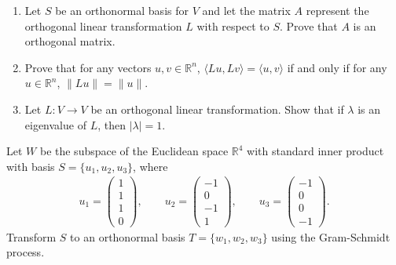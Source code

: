 \documentclass[12pt]{article}
\theoremstyle{remark}
\newtheorem*{solution}{Solution}
\newcommand{\R}{\mathbb{R}}
\renewcommand{\=}{&=&}
\newcommand{\<}{\langle}
\renewcommand{\>}{\rangle}
\newcommand{\bmat}{\begin{pmatrix}}
\newcommand{\emat}{\end{pmatrix}}
\newcommand{\beq}{\begin{eqnarray*}}
\newcommand{\eeq}{\end{eqnarray*}}
\begin{document}
\begin{problems}
\begin{enumerate}
	\item Let $S$ be an orthonormal basis for $V$ and let the matrix $A$ represent the 
	orthogonal linear transformation $L$ with respect to $S$. Prove that $A$ is an 
	orthogonal matrix.
	
	
	\item Prove that for any vectors $u, v \in \R^n$, $\<Lu,Lv\> = \<u,v\>$ if and only if for
	any $u \in \R^n$, $\|Lu\|=\|u\|$.
	
	
	\item Let $L:V \to V$ be an orthogonal linear transformation. Show that
	if $\lambda$ is an eigenvalue of $L$, then $|\lambda| = 1$.
	
\end{enumerate}



\item
Let $W$ be the subspace of the Euclidean space $\R^4$ with standard inner product with
basis $S = \{u_1, u_2, u_3\}$, where
\beq
	u_1 = \bmat 1 \\ 1 \\ 1 \\ 0 \emat, \qquad
	u_2 = \bmat -1 \\ 0 \\ -1 \\ 1 \emat, \qquad
	u_3 = \bmat -1 \\ 0 \\ 0 \\ -1 \emat.
\eeq
Transform $S$ to an orthonormal basis $T = \{w_1, w_2, w_3\}$ using the Gram-Schmidt
process.

	




\end{problems}
\end{document}
